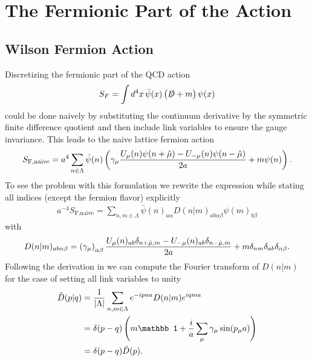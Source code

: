 

\section{The Fermionic Part of the Action}

\subsection{Wilson Fermion Action}
Discretizing the fermionic part of the QCD action
\begin{equation}
    S_F =\int d^4x\,\bar\psi(x)\left(\slashed D +m\right)\psi(x) 
\end{equation}
could be done naively by substituting the continuum derivative by the symmetric finite difference quotient and then include link variables to ensure the gauge invariance. This leads to the naive lattice fermion action
\begin{equation}
    S_{\text{F,naive}}=a^4\sum_{n\in\Lambda}\bar\psi(n) \left(\gamma_\mu\frac{U_\mu(n)\psi(n+\hat\mu)-U_{-\mu}(n)\psi(n-\hat\mu)}{2a}+m\psi(n)\right).
\end{equation}
To see the problem with this formulation we rewrite the expression while stating all indices (except the fermion flavor) explicitly 
\begin{align}
    a^{-4}S_{\text{F,naive}}=\sum_{n,m\in\Lambda}\bar\psi(n)_{a\alpha} D(n|m)_{ab\alpha\beta}\psi(m)_{b\beta}
\end{align}
with
\begin{equation}
    D(n|m)_{ab\alpha\beta}=\left(\gamma_\mu\right)_{\alpha\beta}\frac{U_\mu(n)_{ab}\delta_{n+\hat\mu,m}-U_{-\mu}(n)_{ab}\delta_{n-\hat\mu,m}}{2a}+m\delta_{nm}\delta_{ab}\delta_{\alpha\beta}.
\end{equation}
Following the derivation in \cite{gattringer} we can compute the Fourier transform of $D(n|m)$ for the case of setting all link variables to unity
\begin{align}
    \tilde{D}(p|q)&=\frac{1}{\lvert\Lambda\rvert}\sum_{n,m\in\Lambda}e^{-ipna}D(n|m)e^{iqma}\\
    &=\delta(p-q)\rbr{m\mathbb 1 +\frac{i}{a}\sum_\mu\gamma_\mu\sin(p_\mu a)}\\
    &=\delta(p-q)\tilde D(p).
\end{align}

